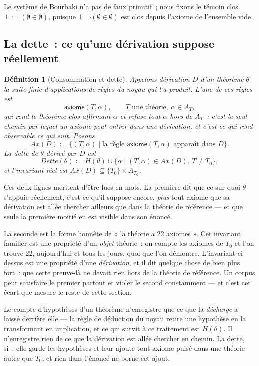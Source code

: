 \documentclass[11pt]{article}
\newtheorem{definition}{Définition}
\theoremstyle{remark}\newtheorem{example}{Exemple}
\begin{document}
Le système de Bourbaki n'a pas de faux primitif~; nous fixons
le témoin clos $\bot := (\emptyset \in \emptyset)$, puisque
$\vdash \neg(\emptyset \in \emptyset)$ est clos depuis l'axiome de l'ensemble vide.

\subsection{La dette~: ce qu'une dérivation suppose réellement}
\begin{definition}[Consommation et dette]
Appelons \emph{dérivation} $D$ d'un théorème $\theta$ la suite finie d'applications de
règles du noyau qui l'a produit. L'une de ces règles est
\[ \mathsf{axiome}(T, \alpha) , \qquad T \text{ une théorie}, \ \alpha \in A_T , \]
qui rend le théorème clos affirmant $\alpha$ et refuse tout $\alpha$ hors de $A_T$~:
c'est le seul chemin par lequel un axiome peut entrer dans une dérivation, et c'est ce
qui rend observable ce qui suit. Posons
\[ Ax(D) := \{ (T, \alpha) \mid \text{la règle } \mathsf{axiome}(T,\alpha) \text{ apparaît dans } D \}. \]
La \emph{dette} de $\theta$ dérivé par $D$ est
\[ \mathit{Dette}(\theta) := H(\theta) \cup \{ \alpha \mid (T,\alpha) \in Ax(D),\, T \neq T_0 \}, \]
et l'\emph{invariant réel} est $Ax(D) \subseteq \{T_0\} \times A_{T_0}$.
\end{definition}

Ces deux lignes méritent d'être lues en mots. La première dit que ce sur quoi $\theta$
s'appuie réellement, c'est ce qu'il suppose encore, \emph{plus} tout axiome que sa
dérivation est allée chercher ailleurs que dans la théorie de référence --- et que
seule la première moitié en est visible dans son énoncé.

La seconde est la forme honnête de « la théorie a 22 axiomes ». Cet invariant familier
est une propriété d'un \emph{objet} théorie~: on compte les axiomes de $T_0$ et l'on
trouve 22, aujourd'hui et tous les jours, quoi que l'on démontre. L'invariant ci-dessus
est une propriété d'une \emph{dérivation}, et il dit quelque chose de bien plus fort~:
que cette preuve-là ne devait rien hors de la théorie de référence. Un corpus peut
satisfaire le premier partout et violer le second constamment --- et c'est cet écart
que mesure le reste de cette section.

Le compte d'hypothèses d'un théorème n'enregistre que ce que la \emph{décharge} a
laissé derrière elle --- la règle de déduction du noyau retire une hypothèse en la
transformant en implication, et ce qui survit à ce traitement est $H(\theta)$. Il
n'enregistre rien de ce que la dérivation est allée chercher en chemin. La dette, si~:
elle garde les hypothèses et leur ajoute tout axiome puisé dans une théorie autre que
$T_0$, et rien dans l'énoncé ne borne cet ajout.
\end{document}
